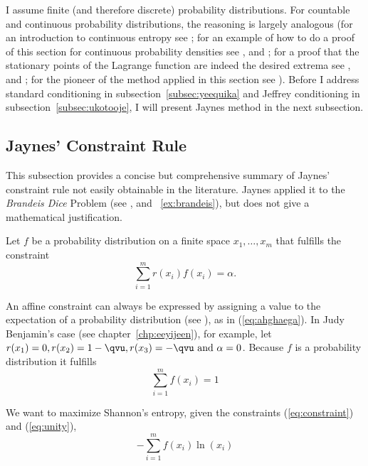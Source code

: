 \documentclass[phd,12pt,oneside]{ubcthesis}
\begin{document}
I assume finite (and therefore discrete) probability distributions.
For countable and continuous probability distributions, the reasoning
is largely analogous (for an introduction to continuous entropy see
; for an example of how to do a proof of this
section for continuous probability densities see
, and ; for a proof
that the stationary points of the Lagrange function are indeed the
desired extrema see , and
; for the pioneer of the method applied
in this section see ). Before I address
standard conditioning in subsection~\ref{subsec:yeequika} and 
Jeffrey conditioning in subsection~\ref{subsec:ukotooje}, I will
present Jaynes method in the next subsection.

\subsection{Jaynes' Constraint Rule}
\label{subsec:choiwohk}

This subsection provides a concise but comprehensive summary of
Jaynes' constraint rule not easily obtainable in the literature.
Jaynes applied it to the \emph{Brandeis Dice} Problem (see
, and {\xample}~\ref{ex:brandeis}), but does
not give a mathematical justification.

Let $f$ be a probability distribution on a finite space
$x_{1},\ldots,x_{m}$ that fulfills the constraint 
\begin{equation}
  \label{eq:constraint}
\sum_{i=1}^{m}r(x_{i})f(x_{i})=\alpha.
\end{equation}

{\noindent}An affine constraint can always be expressed by assigning a value to
the expectation of a probability distribution (see
), as in (\ref{eq:ahghaega}). In Judy Benjamin's
case (see chapter~\ref{chp:eeyijeen}), for example, let
$r(x_{1})=0, r(x_{2})=1-{\qvu}, r(x_{3})=-{\qvu}\mbox{ and }\alpha=0$.
Because $f$ is a probability distribution it fulfills
\begin{equation}
  \label{eq:unity}
\sum_{i=1}^{m}f(x_{i})=1
\end{equation}

{\noindent}We want to maximize Shannon's entropy, given the constraints
({\ref{eq:constraint}}) and ({\ref{eq:unity}}),
\begin{equation}
  \label{eq:entropy}
-\sum_{i=1}^{m}f(x_{i})\ln(x_{i})
\end{equation}
\end{document}
